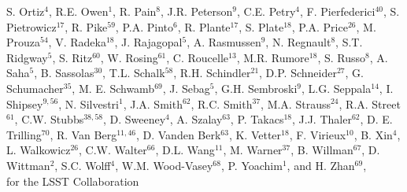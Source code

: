 {S. Ortiz$^4$, 
R.E. Owen$^1$,
R. Pain$^{8}$,
J.R. Peterson$^{9}$,
C.E. Petry$^{4}$,  
F. Pierfederici$^{40}$,
S. Pietrowicz$^{17}$,
R. Pike$^{59}$,
P.A. Pinto$^{6}$,   
R. Plante$^{17}$,
S. Plate$^{18}$, 
P.A. Price$^{26}$,
M. Prouza$^{54}$,
V. Radeka$^{18}$, 
J. Rajagopal$^5$,   
A. Rasmussen$^9$,
N. Regnault$^8$,  
S.T. Ridgway$^5$, 
S. Ritz$^{60}$, 
W. Rosing$^{61}$,
C. Roucelle$^{13}$, 
M.R. Rumore$^{18}$, 
S. Russo$^8$,  
A. Saha$^{5}$,     
B. Sassolas$^{30}$, 
T.L. Schalk$^{58}$,     
R.H. Schindler$^{21}$,
D.P. Schneider$^{27}$,    
G. Schumacher$^{35}$,
M. E. Schwamb$^{69}$,
J. Sebag$^5$,
G.H. Sembroski$^9$, 
L.G. Seppala$^{14}$,
I. Shipsey$^{9,56}$,
N. Silvestri$^1$,
J.A. Smith$^{62}$,    
R.C. Smith$^{37}$,
M.A. Strauss$^{24}$,     
R.A. Street$^{61}$,     
C.W. Stubbs$^{38,58}$,
D. Sweeney$^4$,
A. Szalay$^{63}$,
P. Takacs$^{18}$, 
J.J. Thaler$^{62}$,
D. E. Trilling$^{70}$,
R. Van Berg$^{11,46}$, 
D. Vanden Berk$^{63}$,  
K. Vetter$^{18}$, 
F. Virieux$^{10}$, 
B. Xin$^4$,
L. Walkowicz$^{26}$,
C.W. Walter$^{66}$, 
D.L. Wang$^{11}$,
M. Warner$^{37}$,
B. Willman$^{67}$,
D. Wittman$^2$,
S.C. Wolff$^4$, 
W.M. Wood-Vasey$^{68}$,  
P. Yoachim$^1$,
and H. Zhan$^{69}$, \\
for the LSST Collaboration
}
\affil{}


